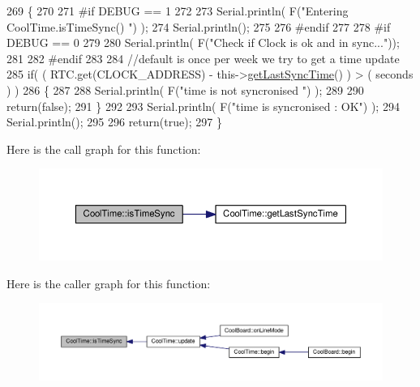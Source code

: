 \begin{DoxyCode}
269 \{
270 
271 \textcolor{preprocessor}{#if DEBUG == 1}
272 
273     Serial.println( F(\textcolor{stringliteral}{"Entering CoolTime.isTimeSync() "}) );
274     Serial.println();
275 
276 \textcolor{preprocessor}{#endif }
277 
278 \textcolor{preprocessor}{#if DEBUG == 0}
279 
280     Serial.println( F(\textcolor{stringliteral}{"Check if Clock is ok and in sync..."}));
281 
282 \textcolor{preprocessor}{#endif}
283 
284     \textcolor{comment}{//default is once per week we try to get a time update}
285     \textcolor{keywordflow}{if}( ( RTC.get(CLOCK\_ADDRESS) - this->\hyperlink{class_cool_time_a5d17f707a9d337720493b2bce9d41c21}{getLastSyncTime}() ) > ( seconds ) ) 
286     \{
287 
288         Serial.println( F(\textcolor{stringliteral}{"time is not syncronised "}) );
289     
290         \textcolor{keywordflow}{return}(\textcolor{keyword}{false});  
291     \}
292     
293     Serial.println( F(\textcolor{stringliteral}{"time is syncronised : OK"}) );
294     Serial.println();
295 
296     \textcolor{keywordflow}{return}(\textcolor{keyword}{true});
297 \}
\end{DoxyCode}
Here is the call graph for this function\+:\nopagebreak
\begin{figure}[H]
\begin{center}
\leavevmode
\includegraphics[width=350pt]{d6/d49/class_cool_time_a5ae038a4498602b189f76a10bf02adf8_cgraph}
\end{center}
\end{figure}
Here is the caller graph for this function\+:\nopagebreak
\begin{figure}[H]
\begin{center}
\leavevmode
\includegraphics[width=350pt]{d6/d49/class_cool_time_a5ae038a4498602b189f76a10bf02adf8_icgraph}
\end{center}
\end{figure}
\mbox{\label{class_cool_time_af355e7f9b3898211cd2ff25eab5933b1}} 
